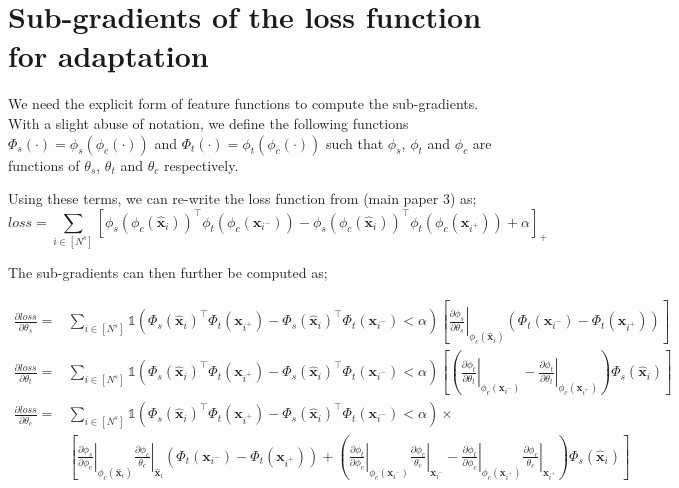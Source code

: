 \documentclass{article}
\newcommand{\xsi}{\mathbf{\hat{x}}_i}
\newcommand\at[2]{\left.#1\right|_{#2}}
\begin{document}
\section{Sub-gradients of the loss function for adaptation} 
We need the explicit form of feature functions to compute the sub-gradients. With a slight abuse of notation, we define the following functions $\Phi_s(\cdot) = \phi_s (\phi_c(\cdot))$ and $\Phi_t(\cdot) = \phi_t (\phi_c(\cdot))$ such that $\phi_s$, $\phi_t$ and $\phi_c$ are functions of $\theta_s$, $\theta_t$ and $\theta_c$ respectively.

Using these terms, we can re-write the loss function from (main paper 3) as;
\begin{equation}
loss =  \sum_{i \in [N^s]} [\phi_{s}(\phi_{c}(\xsi))^\intercal \phi_{t}(\phi_{c}(\mathbf{x}_{i^-})) -\phi_{s}(\phi_{c}(\xsi))^\intercal \phi_{t}(\phi_{c}(\mathbf{x}_{i^+})) + \alpha]_{+}
\end{equation}

The sub-gradients can then further be computed as;

{\scriptsize
\begin{equation}
\begin{aligned}
\frac{\partial loss}{\partial \theta_s} = &\sum_{i \in [N^s]} \mathds{1}(\Phi_s(\xsi)^\intercal \Phi_t(\mathbf{x}_{i^+}) - \Phi_s(\xsi)^\intercal \Phi_t(\mathbf{x}_{i^-}) < \alpha) \left[ \at{\frac{\partial \phi_s}{\partial \theta_s}}{\phi_c(\xsi)} \left(\Phi_t(\mathbf{x}_{i^-}) -  \Phi_t(\mathbf{x}_{i^+})\right) \right] \\
\frac{\partial loss}{\partial \theta_t} = &\sum_{i \in [N^s]} \mathds{1}(\Phi_s(\xsi)^\intercal \Phi_t(\mathbf{x}_{i^+}) - \Phi_s(\xsi)^\intercal \Phi_t(\mathbf{x}_{i^-}) < \alpha) \left[ \left( \at{\frac{\partial \phi_t  } {\partial \theta_t}}{\phi_c(\mathbf{x}_{i^-})}  - \at{\frac{\partial \phi_t} {\partial \theta_t}}{\phi_c(\mathbf{x}_{i^+})}  \right)  \Phi_s(\xsi) \right] \\
\frac{\partial loss}{\partial \theta_c} = &\sum_{i \in [N^s]} \mathds{1}(\Phi_s(\xsi)^\intercal \Phi_t(\mathbf{x}_{i^+}) - \Phi_s(\xsi)^\intercal \Phi_t(\mathbf{x}_{i^-}) < \alpha) \times \\
&\left[ \at{\frac{\partial \phi_s}{\partial \phi_c}}{\phi_c(\xsi)} \at{\frac{\partial \phi_c}{\theta_c}}{\xsi} \left(\Phi_t(\mathbf{x}_{i^-}) - \Phi_t(\mathbf{x}_{i^+})\right)  \right.  + \left.  \left(\at{\frac{\partial \phi_t}{\partial \phi_c}}{\phi_c(\mathbf{x}_{i^-})} \at{\frac{\partial \phi_c}{\theta_c}}{\mathbf{x}_{i^-}} - \at{\frac{\partial \phi_t}{\partial \phi_c}}{\phi_c(\mathbf{x}_{i^+})} \at{\frac{\partial \phi_c}{\theta_c}}{\mathbf{x}_{i^+}}\right) \Phi_s (\xsi) \right]
\end{aligned}
\end{equation}
}



\clearpage
\setlength{\bibsep}{2pt plus 0.25ex}
{\small


}
\end{document}
